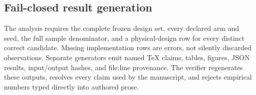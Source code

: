 \subsection{Fail-closed result generation}

The analysis requires the complete frozen design set, every declared arm and
seed, the full sample denominator, and a physical-design row for every distinct
correct candidate.  Missing implementation rows are errors, not silently
discarded observations.  Separate generators emit named TeX claims, tables,
figures, JSON results, input/output hashes, and file:line provenance.  The
verifier regenerates these outputs, resolves every claim used by the manuscript,
and rejects empirical numbers typed directly into authored prose.

